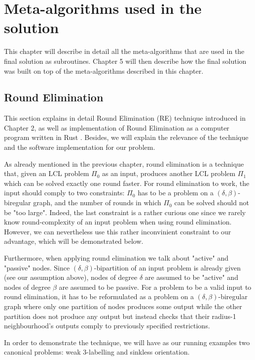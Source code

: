 \chapter{Meta-algorithms used in the solution}
\label{chapter:environment}

This chapter will describe in detail all the meta-algorithms that are
used in the final solution as subroutines.
Chapter 5 will then
describe how the final solution was built on top of the meta-algorithms
described in this chapter.

\section{Round Elimination}

This section explains in detail Round Elimination (RE)
technique introduced in Chapter 2, as well as
implementation of Round Elimination as a computer
program written in Rust \cite{Brandt2019, Olivetti2020}.
Besides, we will explain the relevance of the technique
and the software implementation for our problem.

As already mentioned in the previous chapter, round elimination
is a technique that, given an LCL problem $\Pi_0$ as an input, produces
another LCL problem $\Pi_1$ which can be solved exactly one round
faster. For round elimination to work, the input should comply
to two constraints: $\Pi_0$ has to be a problem on a $(\delta, \beta)$-
biregular graph, and the number of rounds in which $\Pi_0$ can be solved
should not be "too large". Indeed, the last constraint is a rather curious one
since we rarely know round-complexity of an input problem when using
round elimination. However, we can nevertheless use this rather inconvinient constraint
to our advantage, which will be demonstrated below.

Furthermore, when applying round elimination we talk about "active" and
"passive" nodes. Since $(\delta, \beta)$-bipartition of an input problem is
already given (see our assumption above), nodes of degree $\delta$ are assumed
to be "active" and nodes of degree $\beta$ are assumed to be passive. For a problem
to be a valid input to round elimination, it has to be reformulated as a problem on
a $(\delta, \beta)$-biregular graph where only one partition of nodes produces
some output while the other partition does not produce any output but instead
checks that their radius-1 neighbourhood's outputs comply to previously
specified restrictions.

In order to demonstrate the technique, we will have as our running
examples two canonical problems: weak 3-labelling and sinkless orientation.

